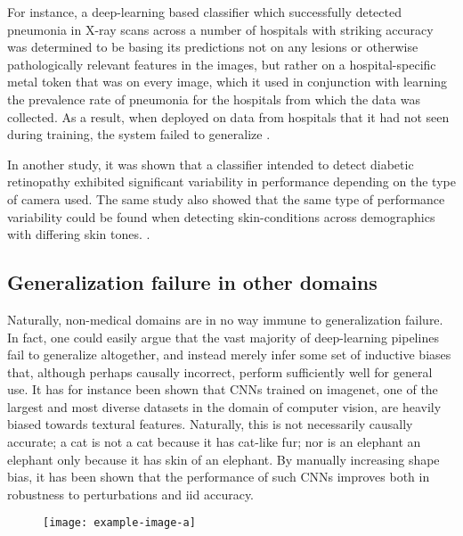	For instance, a deep-learning based classifier which successfully detected pneumonia in X-ray scans across a number of hospitals with striking accuracy was determined to be basing its predictions not on any lesions or otherwise pathologically relevant features in the images, but rather on a hospital-specific metal token that was on every image, which it used in conjunction with learning the prevalence rate of pneumonia for the hospitals from which the data was collected. As a result, when deployed on data from hospitals that it had not seen during training, the system failed to generalize \cite{pneumonia}. 
		
	In another study, it was shown that a classifier intended to detect diabetic retinopathy exhibited significant variability in performance depending on the type of camera used. The same study also showed that the same type of performance variability could be found when detecting skin-conditions across demographics with differing skin tones. \cite{damour2020underspecification}. 
	 
	\subsection{Generalization failure in other domains}
	Naturally, non-medical domains are in no way immune to generalization failure. In fact, one could easily argue that the vast majority of deep-learning pipelines fail to generalize altogether, and instead merely infer some set of inductive biases that, although perhaps causally incorrect, perform sufficiently well for general use. It has for instance been shown that CNNs trained on imagenet, one of the largest and most diverse datasets in the domain of computer vision, are heavily biased towards textural features\cite{texturebias}. Naturally, this is not necessarily causally accurate; a cat is not a cat because it has cat-like fur; nor is an elephant an elephant only because it has skin of an elephant. By manually increasing shape bias, it has been shown that the performance of such CNNs improves both in robustness to perturbations and iid accuracy.

	\begin{figure}[H]
		\texttt{[image: example-image-a]}
		\caption{}
		\label{cat_elephant}
	\end{figure}
	
